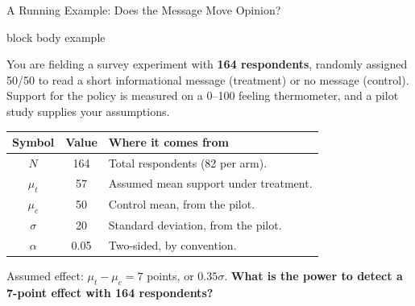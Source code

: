 \documentclass[
  ignorenonframetext,
  aspectratio=169,
]{beamer}
\newenvironment{notebox}{%
  \begin{center}%
  \begin{minipage}{0.95\textwidth}%
  \begin{beamercolorbox}[wd=\textwidth, sep=6pt]{block body example}%
}{%
  \end{beamercolorbox}%
  \end{minipage}%
  \end{center}%
}
\begin{document}
\begin{frame}{A Running Example: Does the Message Move Opinion?}
\label{a-running-example-does-the-message-move-opinion}
\begin{notebox}
\small You are fielding a survey experiment with \textbf{164 respondents}, randomly assigned 50/50 to read a short informational message (treatment) or no message (control). Support for the policy is measured on a 0--100 feeling thermometer, and a pilot study supplies your assumptions.
\end{notebox}

\vspace{0.2em}

\begin{center}
\small
\setlength{\tabcolsep}{7pt}
\renewcommand{\arraystretch}{1.2}
\begin{tabular}{cc>{\raggedright\arraybackslash}p{7.4cm}}
\toprule
\textbf{Symbol} & \textbf{Value} & \textbf{Where it comes from} \\
\midrule
$N$      & 164  & Total respondents (82 per arm). \\
$\mu_t$  & 57   & Assumed mean support under treatment. \\
$\mu_c$  & 50   & Control mean, from the pilot. \\
$\sigma$ & 20   & Standard deviation, from the pilot. \\
$\alpha$ & 0.05 & Two-sided, by convention. \\
\bottomrule
\end{tabular}
\end{center}

\vspace{0.2em}

\small Assumed effect: \(\mu_t - \mu_c = 7\) points, or \(0.35\sigma\).
\textbf{What is the power to detect a 7-point effect with 164 respondents?}
\end{frame}
\end{document}
